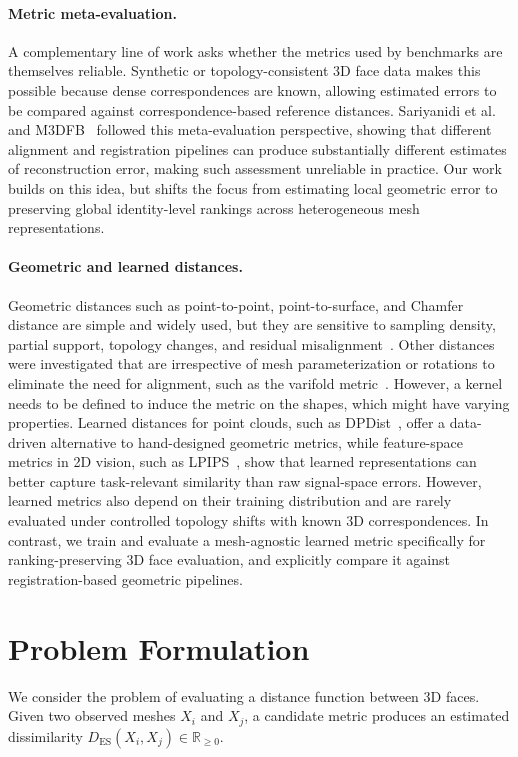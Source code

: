 \documentclass{article}
\begin{document}
\paragraph{Metric meta-evaluation.}
A complementary line of work asks whether the metrics used by benchmarks are themselves reliable. Synthetic or topology-consistent 3D face data makes this possible because dense correspondences are known, allowing estimated errors to be compared against correspondence-based reference distances. Sariyanidi et al.~\cite{10448898} and M3DFB~\cite{fg2025} followed this meta-evaluation perspective, showing that different alignment and registration pipelines can produce substantially different estimates of reconstruction error, making such assessment unreliable in practice. Our work builds on this idea, but shifts the focus from estimating local geometric error to preserving global identity-level rankings across heterogeneous mesh representations.

\paragraph{Geometric and learned distances.}
Geometric distances such as point-to-point, point-to-surface, and Chamfer distance are simple and widely used, but they are sensitive to sampling density, partial support, topology changes, and residual misalignment~\cite{achlioptas2018learning,nguyen2021point}. Other distances were investigated that are irrespective of mesh parameterization or rotations to eliminate the need for alignment, such as the varifold metric~\cite{kaltenmark2017general, pierson20223d}. However, a kernel needs to be defined to induce the metric on the shapes, which might have varying properties. Learned distances for point clouds, such as DPDist~\cite{urbach2020dpdist}, offer a data-driven alternative to hand-designed geometric metrics, while feature-space metrics in 2D vision, such as LPIPS~\cite{lpips}, show that learned representations can better capture task-relevant similarity than raw signal-space errors. However, learned metrics also depend on their training distribution and are rarely evaluated under controlled topology shifts with known 3D correspondences. In contrast, we train and evaluate a mesh-agnostic learned metric specifically for ranking-preserving 3D face evaluation, and explicitly compare it against registration-based geometric pipelines.

\section{Problem Formulation}
\label{sec:problem_formulation}
We consider the problem of evaluating a distance function between 3D faces.
Given two observed meshes $X_i$ and $X_j$, a candidate metric produces an estimated dissimilarity
%
$D_{\mathrm{ES}}(X_i,X_j) \in \mathbb{R}_{\ge 0}$.
\end{document}
